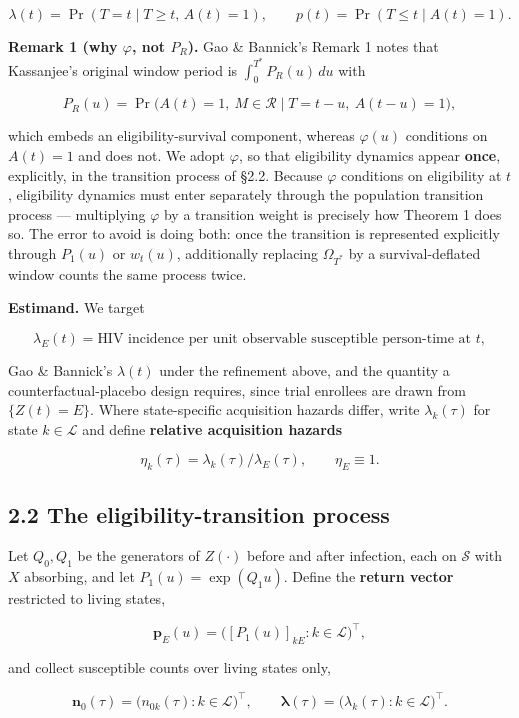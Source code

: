 \[
\lambda(t)=\Pr(T=t\mid T\ge t,\,A(t)=1),\qquad p(t)=\Pr(T\le t\mid A(t)=1).
\]

\textbf{Remark 1 (why \(\varphi\), not \(P_R\)).} Gao \& Bannick's Remark 1 notes that Kassanjee's original window period is \(\int_0^{T^*}P_R(u)\,du\) with

\[
P_R(u)=\Pr\big(A(t)=1,\ M\in\mathcal{R}\mid T=t-u,\ A(t-u)=1\big),
\]

which embeds an eligibility-survival component, whereas \(\varphi(u)\) conditions on \(A(t)=1\) and does not. We adopt \(\varphi\), so that eligibility dynamics appear \textbf{once}, explicitly, in the transition process of §2.2. Because \(\varphi\) conditions on eligibility at \(t\), eligibility dynamics must enter separately through the population transition process --- multiplying \(\varphi\) by a transition weight is precisely how Theorem 1 does so. The error to avoid is doing both: once the transition is represented explicitly through \(P_1(u)\) or \(w_t(u)\), additionally replacing \(\Omega_{T^*}\) by a survival-deflated window counts the same process twice.

\textbf{Estimand.} We target

\[
\lambda_E(t) = \text{HIV incidence per unit observable susceptible person-time at } t,
\]

Gao \& Bannick's \(\lambda(t)\) under the refinement above, and the quantity a counterfactual-placebo design requires, since trial enrollees are drawn from \(\{Z(t)=E\}\). Where state-specific acquisition hazards differ, write \(\lambda_k(\tau)\) for state \(k\in\mathcal{L}\) and define \textbf{relative acquisition hazards}

\[
\eta_k(\tau) = \lambda_k(\tau)/\lambda_E(\tau), \qquad \eta_E\equiv 1 .
\]

\subsection{2.2 The eligibility-transition process}

Let \(Q_0,Q_1\) be the generators of \(Z(\cdot)\) before and after infection, each on \(\mathcal{S}\) with \(X\) absorbing, and let \(P_1(u)=\exp(Q_1u)\). Define the \textbf{return vector} restricted to living states,

\[
\mathbf{p}_E(u) = \big([P_1(u)]_{kE} : k\in\mathcal{L}\big)^{\!\top},
\]

and collect susceptible counts over living states only,

\[
\mathbf{n}_0(\tau) = \big(n_{0k}(\tau):k\in\mathcal{L}\big)^{\!\top},
\qquad
\boldsymbol\lambda(\tau)=\big(\lambda_k(\tau):k\in\mathcal{L}\big)^{\!\top}.
\]

